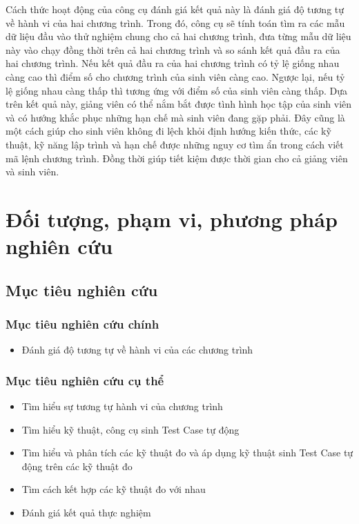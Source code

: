 Cách thức hoạt động của công cụ đánh giá kết quả này là đánh giá độ tương tự về hành vi của hai chương trình. Trong đó, công cụ sẽ tính toán tìm ra các mẫu dữ liệu đầu vào thử nghiệm chung cho cả hai chương trình, đưa từng mẫu dữ liệu này vào chạy đồng thời trên cả hai chương trình và so sánh kết quả đầu ra của hai chương trình. Nếu kết quả đầu ra của hai chương trình có tỷ lệ giống nhau càng cao thì điểm số cho chương trình của sinh viên càng cao. Ngược lại, nếu tỷ lệ giống nhau càng thấp thì tương ứng với điểm số của sinh viên càng thấp. Dựa trên kết quả này, giảng viên có thể nắm bắt được tình hình học tập của sinh viên và có hướng khắc phục những hạn chế mà sinh viên đang gặp phải. Đây cũng là một cách giúp cho sinh viên không đi lệch khỏi định hướng kiến thức, các kỹ thuật, kỹ năng lập trình và hạn chế được những nguy cơ tìm ẩn trong cách viết mã lệnh chương trình. Đồng thời giúp tiết kiệm được thời gian cho cả giảng viên và sinh viên.

\section{Đối tượng, phạm vi, phương pháp nghiên cứu}

	\subsection*{Mục tiêu nghiên cứu}
		\subsubsection*{Mục tiêu nghiên cứu chính}
		\begin{itemize}
		\item Đánh giá độ tương tự về hành vi của các chương trình
		\end{itemize}
		
		\subsubsection*{Mục tiêu nghiên cứu cụ thể}
		\begin{itemize}
		\item Tìm hiểu sự tương tự hành vi của chương trình
		\item  Tìm hiểu kỹ thuật, công cụ sinh Test Case tự động
		\item  Tìm hiểu và phân tích các kỹ thuật đo và áp dụng kỹ thuật sinh Test Case tự động trên các kỹ thuật đo
		\item  Tìm cách kết hợp các kỹ thuật đo với nhau
		\item  Đánh giá kết quả thực nghiệm
		\end{itemize}

